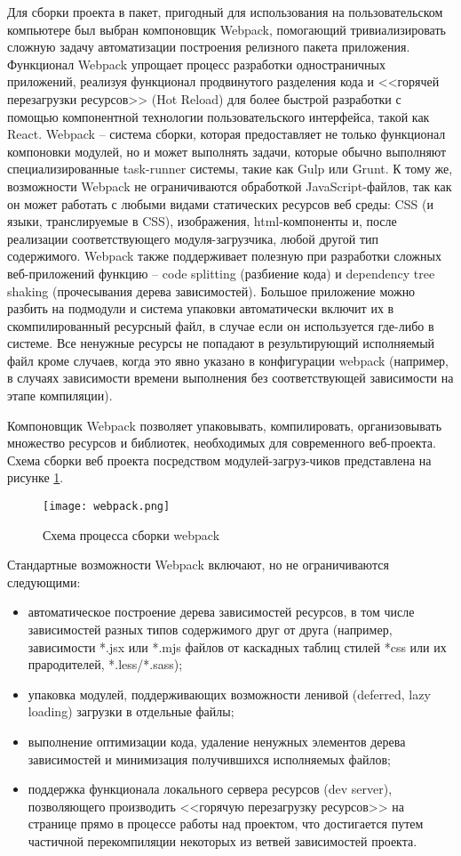 Для сборки проекта в пакет, пригодный для использования на пользовательском компьютере был выбран компоновщик Webpack\cite{webpack}\cite{webpack2}, помогающий тривиализировать сложную задачу
автоматизации построения релизного пакета приложения. Функционал Webpack упрощает процесс разработки одностраничных приложений, реализуя функционал продвинутого
разделения кода и <<горячей перезагрузки ресурсов>> (Hot Reload) для более быстрой разработки с помощью компонентной технологии пользовательского интерфейса, такой как React.
Webpack -- система сборки, которая предоставляет не только функционал компоновки модулей, но и может выполнять задачи, которые обычно выполняют специализированные task-runner системы,
такие как Gulp или Grunt. К тому же, возможности Webpack не ограничиваются обработкой JavaScript-файлов, так как он может работать с любыми видами статических ресурсов веб среды:
CSS (и языки, транслируемые в CSS), изображения, html-компоненты и, после реализации соответствующего модуля-загрузчика, любой другой тип содержимого. Webpack также поддерживает
полезную при разработки сложных веб-приложений функцию -- code splitting (разбиение кода) и dependency tree shaking (прочесывания дерева зависимостей). Большое приложение можно
разбить на подмодули и система упаковки автоматически включит их в скомпилированный ресурсный файл, в случае если он используется где-либо в системе. Все ненужные ресурсы не попадают
в результирующий исполняемый файл кроме случаев, когда это явно указано в конфигурации webpack (например, в случаях зависимости времени выполнения без соответствующей зависимости на
этапе компиляции).

Компоновщик Webpack позволяет упаковывать, компилировать, организовывать множество ресурсов и библиотек, необходимых для современного веб-проекта. Схема сборки веб проекта посредством
модулей-загруз-чиков представлена на рисунке \ref{figure:domain:webpack}.

\begin{figure}[ht]
\centering
  \texttt{[image: webpack.png]}
  \caption{Схема процесса сборки webpack}
  \label{figure:domain:webpack}
\end{figure}

Стандартные возможности Webpack включают, но не ограничиваются следующими:
\begin{itemize}
\item автоматическое построение дерева зависимостей ресурсов, в том числе зависимостей разных типов содержимого друг от друга (например, зависимости *.jsx или *.mjs файлов от каскадных таблиц
стилей *css или их прародителей, *.less/*.sass);
\item упаковка модулей, поддерживающих возможности ленивой (deferred, lazy loading) загрузки в отдельные файлы;
\item выполнение оптимизации кода, удаление ненужных элементов дерева зависимостей и минимизация получившихся исполняемых файлов;
\item поддержка функционала локального сервера ресурсов (dev server), позволяющего производить <<горячую перезагрузку ресурсов>> на странице прямо в процессе работы над проектом, что достигается
путем частичной перекомпиляции некоторых из ветвей зависимостей проекта.
\end{itemize}

